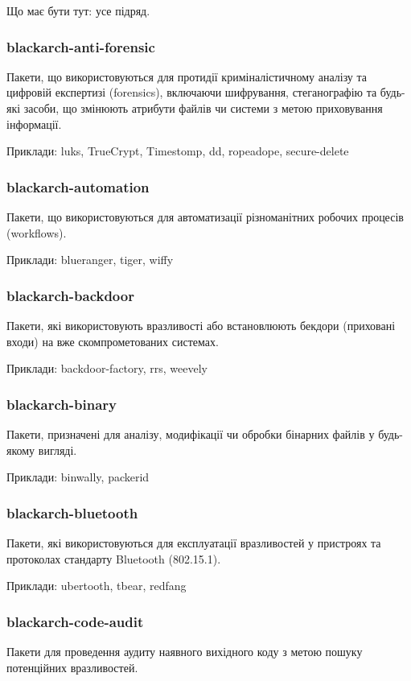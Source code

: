 \documentclass[a4paper, oneside, 11pt]{book}
\begin{document}
Що має бути тут: усе підряд.

\subsubsection{blackarch-anti-forensic}
Пакети, що використовуються для протидії криміналістичному аналізу та цифровій експертизі (forensics), включаючи шифрування, стеганографію та будь-які засоби, що змінюють атрибути файлів чи системи з метою приховування інформації.

Приклади: luks, TrueCrypt, Timestomp, dd, ropeadope, secure-delete

\subsubsection{blackarch-automation}
Пакети, що використовуються для автоматизації різноманітних робочих процесів (workflows).

Приклади: blueranger, tiger, wiffy

\subsubsection{blackarch-backdoor}
Пакети, які використовують вразливості або встановлюють бекдори (приховані входи) на вже скомпрометованих системах.

Приклади: backdoor-factory, rrs, weevely

\subsubsection{blackarch-binary}
Пакети, призначені для аналізу, модифікації чи обробки бінарних файлів у будь-якому вигляді.

Приклади: binwally, packerid

\subsubsection{blackarch-bluetooth}
Пакети, які використовуються для експлуатації вразливостей у пристроях та протоколах стандарту Bluetooth (802.15.1).

Приклади: ubertooth, tbear, redfang

\subsubsection{blackarch-code-audit}
Пакети для проведення аудиту наявного вихідного коду з метою пошуку потенційних вразливостей.
\end{document}
